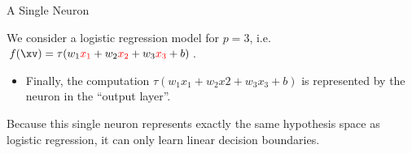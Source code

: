 \begin{frame} {A Single Neuron}

We consider a logistic regression model for $p = 3$, i.e. $f(\xv) = \tau(w_1\textcolor{red}{x_1} + w_2\textcolor{red}{x_2} + w_3\textcolor{red}{x_3} + b)$.

  \begin{itemize}
    \item Finally, the computation $\tau(w_1x_1 + w_2x2 + w_3x_3 + b)$ is represented by the neuron in the \enquote{output layer}.
    \begin{figure}
    \centering
  \end{figure}
  \end{itemize}
  \vspace*{-0.5cm}
    \small{Because this single neuron represents exactly the same hypothesis space as logistic regression, it can only learn linear decision boundaries.}
\end{frame}



